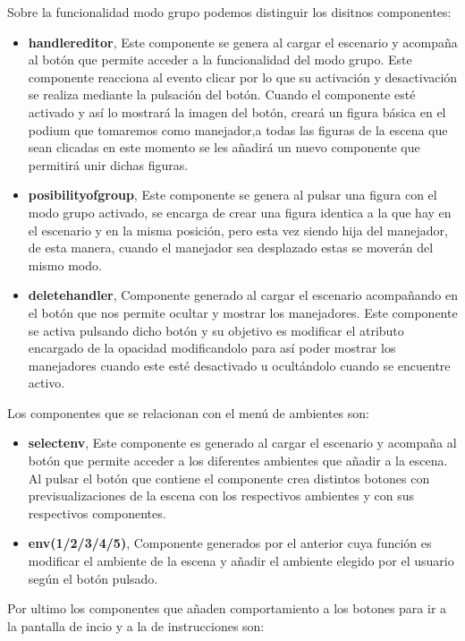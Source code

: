 \documentclass[a4paper, 12pt]{book}
\begin{document}
    
Sobre la funcionalidad modo grupo podemos distinguir los disitnos componentes:
\begin{itemize}
    \item \textbf{handlereditor}, Este componente se genera al cargar el escenario y acompaña al botón que permite acceder a la funcionalidad del modo grupo. Este componente reacciona al evento clicar por lo que su activación y desactivación se realiza mediante la pulsación del botón. Cuando el componente esté activado y así lo mostrará la imagen del botón, creará un figura básica en el podium que tomaremos como manejador,a todas las figuras de la escena que sean clicadas en este momento se les añadirá un nuevo componente que permitirá unir dichas figuras.
    
    \item \textbf{posibilityofgroup}, Este componente se genera al pulsar una figura con el modo grupo activado, se encarga de crear una figura identica a la que hay en el escenario y en la misma posición, pero esta vez siendo hija del manejador, de esta manera, cuando el manejador sea desplazado estas se moverán del mismo modo.
    
    \item \textbf{deletehandler}, Componente generado al cargar el escenario acompañando en el botón que nos permite ocultar y mostrar los manejadores. Este componente se activa pulsando dicho botón y su objetivo es modificar el atributo encargado de la opacidad modificandolo para así poder mostrar los manejadores cuando este esté desactivado u ocultándolo cuando se encuentre activo.
\end{itemize}

Los componentes que se relacionan con el menú de ambientes son:
\begin{itemize}
    \item \textbf{selectenv}, Este componente es generado al cargar el escenario y acompaña al botón que permite acceder a los diferentes ambientes que añadir a la escena. Al pulsar el botón que contiene el componente crea distintos botones con previsualizaciones de la escena con los respectivos ambientes y con sus respectivos componentes.
    \item \textbf{env(1/2/3/4/5)}, Componente generados por el anterior cuya función es modificar el ambiente de la escena y añadir el ambiente elegido por el usuario según el botón pulsado.
    
\end{itemize}

Por ultimo los componentes que añaden comportamiento a los botones para ir a la pantalla de incio y a la de instrucciones son:
\end{document}
